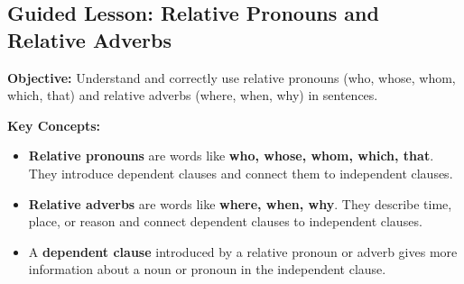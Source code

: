 \documentclass[12pt]{article}
\title{}
\date{}
\begin{document}
\subsection*{Guided Lesson: Relative Pronouns and Relative Adverbs}
\onehalfspacing

\begin{tcolorbox}[colframe=black!40, colback=gray!5, 
coltitle=black, colbacktitle=black!20, fonttitle=\bfseries\Large, 
title=Learning Objective, halign title=center, left=5pt, right=5pt, top=5pt, bottom=15pt]
\textbf{Objective:} Understand and correctly use relative pronouns (who, whose, whom, which, that) and relative adverbs (where, when, why) in sentences.
\end{tcolorbox}

\vspace{1em}

\begin{tcolorbox}[colframe=black!60, colback=white, 
coltitle=black, colbacktitle=black!15, fonttitle=\bfseries\Large, 
title=Key Concepts and Vocabulary, halign title=center, left=10pt, right=10pt, top=10pt, bottom=15pt]
\textbf{Key Concepts:}
\begin{itemize}
    \item \textbf{Relative pronouns} are words like \textbf{who, whose, whom, which, that}. They introduce dependent clauses and connect them to independent clauses.
    \item \textbf{Relative adverbs} are words like \textbf{where, when, why}. They describe time, place, or reason and connect dependent clauses to independent clauses.
    \item A \textbf{dependent clause} introduced by a relative pronoun or adverb gives more information about a noun or pronoun in the independent clause.
\end{itemize}
\end{tcolorbox}

\vspace{1em}
\end{document}
